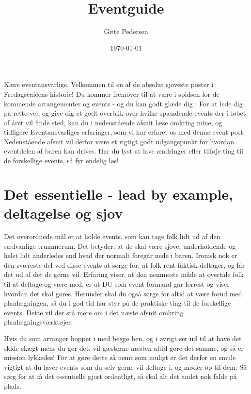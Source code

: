 

\title{Eventguide}
\date{\today}
\author{Gitte Pedersen}



\maketitle

Kære eventansvarlige. Velkommen til en af de absolut sjoveste poster i
Fredagscaféens historie! Du kommer fremover til at være i spidsen for
de kommende arrangementer og events - og du kan godt glæde dig
\Smiley: For at lede dig på rette vej, og give dig et godt overblik
over hvilke spændende events der i løbet af året vil finde sted, kan
du i nedenstående afsnit læse omkring mine, og tidligere
Eventansvarliges erfaringer, som vi har erfaret os med denne event
post. Nedenstående afsnit vil derfor være et rigtigt godt udgangspunkt
for hvordan eventdelen af baren kan drives. Har du lyst at lave
ændringer eller tilføje ting til de forskellige events, så fyr endelig
løs!

\section{Det essentielle - lead by example, deltagelse og sjov}
\label{sec:det-essentielle}

Det overordnede mål er at holde events, som kan tage folk lidt ud af
den sædvanlige trummerum. Det betyder, at de skal være sjove,
underholdende og helst lidt anderledes end hvad der normalt foregår
nede i baren. Ironisk nok er den sværeste del ved disse events at
sørge for, at folk rent faktisk deltager, og får det ud af det de
gerne vil. Erfaring viser, at den nemmeste måde at overtale folk til
at deltage og være med, er at DU som event formand går forrest og
viser hvordan det skal gøres. Herunder skal du også sørge for altid at
være forud med planlægningen, så du i god tid har styr på de praktiske
ting til de forskellige events. Dette vil der stå mere om i det næste
afsnit omkring planlægningsværktøjer.

Hvis du som arrangør hopper i med begge ben, og i øvrigt ser ud til at
have det skide skægt mens du gør det, vil gæsterne næsten altid gøre
det samme, og så er mission lykkedes! For at gøre dette så nemt som
muligt er det derfor en smule vigtigt at du laver events som du selv
gerne vil deltage i, og møder op til dem. Så sørg for at få det
essentielle gjort ordentligt, så skal alt det andet nok falde på
plads.

